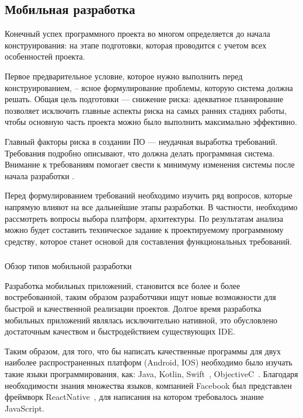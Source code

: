 \subsection{Мобильная разработка}
Конечный успех программного проекта во многом определяется до начала конструирования: на этапе подготовки, которая проводится с учетом всех особенностей проекта.

Первое предварительное условие, которое нужно выполнить перед конструированием, -- ясное формулирование проблемы, которую система должна решать. Общая цель подготовки — снижение риска: адекватное планирование позволяет исключить главные аспекты риска на самых ранних стадиях работы, чтобы основную часть проекта можно было выполнить максимально эффективно. 

Главный факторы риска в создании ПО — неудачная выработка требований. Требования подробно описывают, что должна делать программная система. Внимание к требованиям помогает свести к минимуму изменения системы после начала разработки \cite{code_complete}.

Перед формулированием требований необходимо изучить ряд вопросов, которые напрямую влияют на все дальнейшие этапы разработки. В частности, необходимо рассмотреть вопросы выбора платформ, архитектуры. По результатам анализа можно будет составить техническое задание к проектируемому программному средству, которое станет основой для составления функциональных требований.

\subsubsection{} Обзор типов мобильной разработки
\label{sec:analysis:literature:platforms}

Разработка мобильных приложений, становится все более и более
востребованной, таким образом разработчики ищут новые возможности для
быстрой и качественной реализации проектов. Долгое время разработка
мобильных приложений являлась исключительно нативной, это обусловлено
достаточным качеством и быстродействием существующих IDE.

Таким образом, для того, что бы написать качественные программы для
двух наиболее распространенных платформ (Android, IOS) необходимо было
изучать такие языки программирования, как: Java, Kotlin, Swift~\cite{swift}, ObjectiveC~\cite{objectiveC}. Благодаря необходимости знания множества языков, компанией
Facebook был представлен фреймворк ReactNative~\cite{reactNaitve}, для написания на
котором требовалось знание JavaScript.


